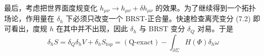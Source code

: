 最后，考虑把世界面度规变化 $h_{\mu\nu}\to h_{\mu\nu}+\delta h_{\mu\nu}$ 的效果。为了继续得到一个拓扑场论，作用量在 $\delta_h$ 下必须只改变一个 BRST-正合量。快速检查离壳变分 (7.2) 即可看出，度规 $h$ 在其中并不出现，因此 $\delta_h$ 与 BRST 变分 $\delta_Q$ 对易。于是
\[
\delta_hS=\delta_Q\delta_hV+\delta_hS_{top}=(\text{Q-exact})-\int_{\partial\Sigma}H(\Phi)\delta_h\omega
\]

